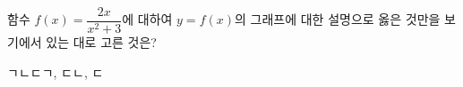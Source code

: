 함수 $f(x)=\dfrac{2x}{x^2+3}$에 대하여 $y=f(x)$의 그래프에 대한 설명으로 옳은 것만을 보기에서 있는 대로 고른 것은? 
\begin{choices32}{ㄱ}{ㄴ}{ㄷ}{ㄱ, ㄷ}{ㄴ, ㄷ}\end{choices32}
